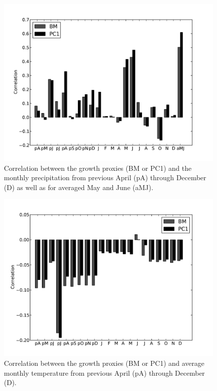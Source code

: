 \begin{figure}
\centering
\includegraphics[width=6in]{figures/climCorrPrecip.pdf}
\caption{Correlation between the growth proxies (BM or PC1) and the monthly precipitation from previous April (pA) through December (D) as well as for averaged May and June (aMJ).}
\label{fig:precipBarCorr}
\end{figure}

\begin{figure}
\centering
\includegraphics[width=6in]{figures/climCorrTemp.pdf}
\caption{Correlation between the growth proxies (BM or PC1) and average monthly temperature from previous April (pA) through December (D).}
\label{fig:tempBarCorr}
\end{figure}

